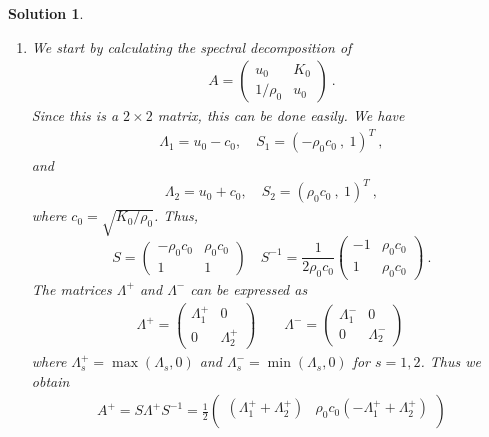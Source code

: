 \documentclass[10pt,letterpaper]{article}
\newcommand{\rb}[1]{ \left(  {#1} \right) }
\newcommand{\sqb}[1]{ \left(  {#1} \right) }
\theoremstyle{break}
\newtheorem{solution}{Solution}
\begin{document}
\begin{solution}
	\begin{enumerate}
		\item
		We start by calculating the spectral decomposition of
		\begin{gather}
			A=\sqb{
				\begin{array}{cc}
					u_{0} & K_{0}\\
					1/\rho_{0} & u_{0}
				\end{array}
			}\ .
		\end{gather}
		Since this is a $2\times2$ matrix, this can be done easily.
		We have
		\begin{gather}
			\Lambda_{1}=u_{0}-c_{0},
			\quad
			S_{1}=\rb{-\rho_{0}c_{0}\ ,\ 1}^T\ ,
		\end{gather}
		and
		\begin{gather}
			\Lambda_{2}=u_{0}+c_{0},
			\quad
			S_{2}=\rb{\rho_{0}c_{0}\ , \ 1}^T\ ,
		\end{gather}
		where $c_{0}=\sqrt{K_{0}/\rho_{0}}$.
		Thus,
		\begin{equation}
			S=\sqb{\begin{array}{cc}
				-\rho_{0}c_{0} & \rho_{0}c_{0}\\
				1 & 1
			\end{array}}
			\quad
			S^{-1}=\frac{1}{2\rho_{0}c_{0}}
				\sqb{\begin{array}{cc}
					-1 & \rho_{0}c_{0}\\
					1 & \rho_{0}c_{0}
				\end{array}}\ .
		\end{equation}
		The matrices $\Lambda^{+}$ and $\Lambda^{-}$ can be expressed as
		\begin{gather}
			\Lambda^{+}=\sqb{\begin{array}{cc}
				\Lambda_1^+ & 0\\
				0 & \Lambda_2^+
			\end{array}}
			\qquad
			\Lambda^{-}=\sqb{\begin{array}{cc}
				\Lambda_1^- & 0\\
				0 & \Lambda_2^-
			\end{array}}\ 
		\end{gather}
		where $\Lambda_s^+ = \max\left(\Lambda_s,0\right)$ and $\Lambda_s^- = \min\left(\Lambda_s,0\right)$ for $s=1,2$. Thus we obtain
		\begin{gather}
			A^{+}=S\Lambda^{+}S^{-1}
				=\frac{1}{2}\sqb{\begin{array}{cc}
					(\Lambda_1^+ + \Lambda_2^+) & \rho_{0}c_{0} (-\Lambda_1^+ + \Lambda_2^+)\\

\end{array}}
\end{gather}
\end{enumerate}
\end{solution}
\end{document}
